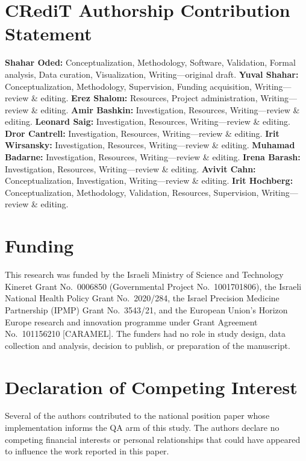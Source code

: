 \documentclass[preprint,12pt]{elsarticle}
\begin{document}







\section*{CRediT Authorship Contribution Statement}
\textbf{Shahar Oded:} Conceptualization, Methodology, Software, Validation,
Formal analysis, Data curation, Visualization, Writing---original draft.
\textbf{Yuval Shahar:} Conceptualization, Methodology, Supervision, Funding
acquisition, Writing---review \& editing.
\textbf{Erez Shalom:} Resources, Project administration, Writing---review \&
editing.
\textbf{Amir Bashkin:} Investigation, Resources, Writing---review \& editing.
\textbf{Leonard Saig:} Investigation, Resources, Writing---review \& editing.
\textbf{Dror Cantrell:} Investigation, Resources, Writing---review \& editing.
\textbf{Irit Wirsansky:} Investigation, Resources, Writing---review \& editing.
\textbf{Muhamad Badarne:} Investigation, Resources, Writing---review \& editing.
\textbf{Irena Barash:} Investigation, Resources, Writing---review \& editing.
\textbf{Avivit Cahn:} Conceptualization, Investigation, Writing---review \&
editing.
\textbf{Irit Hochberg:} Conceptualization, Methodology, Validation,
Resources, Supervision, Writing---review \& editing.

\section*{Funding}
This research was funded by the Israeli Ministry of Science and Technology
Kineret Grant No.~0006850 (Governmental Project No.~1001701806), the Israeli
National Health Policy Grant No.~2020/284, the Israel Precision Medicine
Partnership (IPMP) Grant No.~3543/21, and the European Union's Horizon Europe
research and innovation programme under Grant Agreement No.~101156210
[CARAMEL]. The funders had no role in study design, data collection and
analysis, decision to publish, or preparation of the manuscript.

\section*{Declaration of Competing Interest}
Several of the authors contributed to the national position paper whose
implementation informs the QA arm of this study. The authors declare no
competing financial interests or personal relationships that could have
appeared to influence the work reported in this paper.
\end{document}
